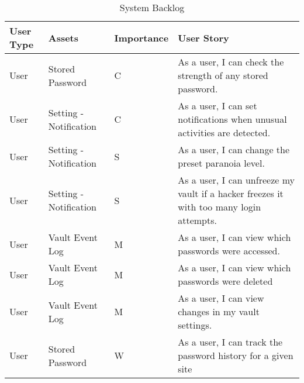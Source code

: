 \documentclass{article}
\begin{document}
\begin{table}[H]
  \centering
  {
    \renewcommand\arraystretch{1.25}
    \begin{tabular}{>{\centering}m{1cm} >{\centering}m{4cm} >{\centering}m{2cm} >{\centering\arraybackslash}m{8cm} }
    \toprule
    User Type & Assets & Importance & User Story \\
    \midrule
    User & Stored Password & C & As a user, I can check the strength of any stored password. \\
    User & Setting - Notification & C & As a user, I can set notifications when unusual activities are detected. \\
    User & Setting - Notification & S &  As a user, I can change the preset paranoia level. \\
    User & Setting - Notification & S & As a user, I can unfreeze my vault if a hacker freezes it with too many login attempts. \\
    User & Vault Event Log & M & As a user, I can view which passwords were accessed. \\
    User & Vault Event Log & M & As a user, I can view which passwords were deleted \\
    User & Vault Event Log & M & As a user, I can view changes in my vault settings. \\
    User & Stored Password & W & As a user, I can track the password history for a given site \\
    \bottomrule
    \end{tabular}
  }
  \caption{System Backlog}
  \label{tab:system_backlog}
\end{table}
\end{document}
